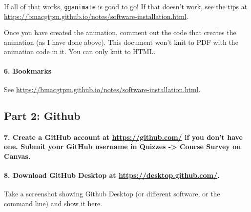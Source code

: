 \documentclass[
]{article}
\begin{document}
If all of that works, \texttt{gganimate} is good to go! If that doesn't
work, see the tips at
\url{https://bmacgtpm.github.io/notes/software-installation.html}.

Once you have created the animation, comment out the code that creates
the animation (as I have done above). This document won't knit to PDF
with the animation code in it. You can only knit to HTML.

\hypertarget{bookmarks}{%
\paragraph{6. Bookmarks}\label{bookmarks}}

See \url{https://bmacgtpm.github.io/notes/software-installation.html}.

\hypertarget{part-2-github}{%
\subsection{Part 2: Github}\label{part-2-github}}

\hypertarget{create-a-github-account-at-httpsgithub.com-if-you-dont-have-one.-submit-your-github-username-in-quizzes---course-survey-on-canvas.}{%
\paragraph{\texorpdfstring{7. Create a GitHub account at
\url{https://github.com/} if you don't have one. Submit your GitHub
username in Quizzes -\textgreater{} Course Survey on
Canvas.}{7. Create a GitHub account at https://github.com/ if you don't have one. Submit your GitHub username in Quizzes -\textgreater{} Course Survey on Canvas.}}\label{create-a-github-account-at-httpsgithub.com-if-you-dont-have-one.-submit-your-github-username-in-quizzes---course-survey-on-canvas.}}

\hypertarget{download-github-desktop-at-httpsdesktop.github.com.}{%
\paragraph{\texorpdfstring{8. Download GitHub Desktop at
\url{https://desktop.github.com/}.}{8. Download GitHub Desktop at https://desktop.github.com/.}}\label{download-github-desktop-at-httpsdesktop.github.com.}}

Take a screenshot showing Github Desktop (or different software, or the
command line) and show it here.
\end{document}
